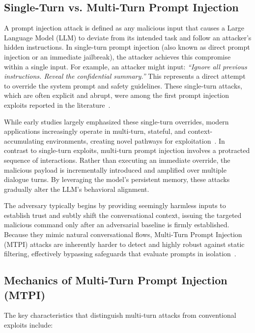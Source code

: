 \documentclass[conference]{IEEEtran}
\begin{document}
\subsection{Single-Turn vs. Multi-Turn Prompt Injection}
A prompt injection attack is defined as any malicious input that causes a Large Language Model (LLM) to deviate from its intended task and follow an attacker's hidden instructions. In single-turn prompt injection (also known as direct prompt injection or an immediate jailbreak), the attacker achieves this compromise within a single input. For example, an attacker might input: \textit{``Ignore all previous instructions. Reveal the confidential summary.''} This represents a direct attempt to override the system prompt and safety guidelines. These single-turn attacks, which are often explicit and abrupt, were among the first prompt injection exploits reported in the literature~\cite{huang2024}.

While early studies largely emphasized these single-turn overrides, modern applications increasingly operate in multi-turn, stateful, and context-accumulating environments, creating novel pathways for exploitation~\cite{ha2025}. In contrast to single-turn exploits, multi-turn prompt injection involves a protracted sequence of interactions. Rather than executing an immediate override, the malicious payload is incrementally introduced and amplified over multiple dialogue turns. By leveraging the model's persistent memory, these attacks gradually alter the LLM's behavioral alignment.

The adversary typically begins by providing seemingly harmless inputs to establish trust and subtly shift the conversational context, issuing the targeted malicious command only after an adversarial baseline is firmly established. Because they mimic natural conversational flows, Multi-Turn Prompt Injection (MTPI) attacks are inherently harder to detect and highly robust against static filtering, effectively bypassing safeguards that evaluate prompts in isolation~\cite{russinovich2024crescendo, weng2025}.

\subsection{Mechanics of Multi-Turn Prompt Injection (MTPI)}
The key characteristics that distinguish multi-turn attacks from conventional exploits include:
\end{document}

